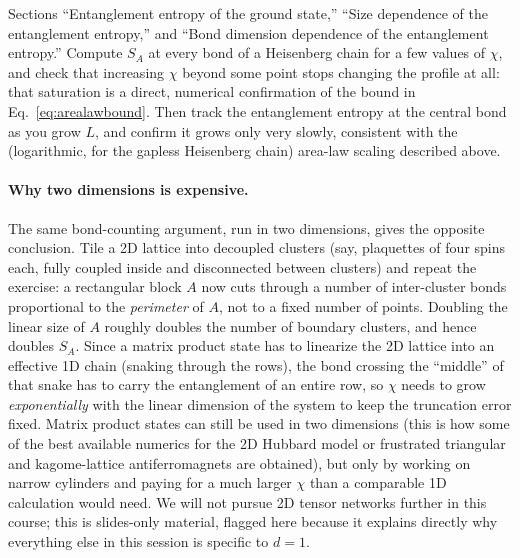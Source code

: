 \documentclass[all_sessions.tex]{subfiles}
\begin{document}
\begin{notebook}
Sections ``Entanglement entropy of the ground state,'' ``Size dependence of the entanglement
entropy,'' and ``Bond dimension dependence of the entanglement entropy.'' Compute $S_A$ at every
bond of a Heisenberg chain for a few values of $\chi$, and check that increasing $\chi$ beyond
some point stops changing the profile at all: that saturation is a direct, numerical confirmation
of the bound in Eq.~\eqref{eq:arealawbound}. Then track the entanglement entropy at the central
bond as you grow $L$, and confirm it grows only very slowly, consistent with the (logarithmic, for
the gapless Heisenberg chain) area-law scaling described above.
\end{notebook}

\paragraph{Why two dimensions is expensive.} The same bond-counting argument, run in two
dimensions, gives the opposite conclusion. Tile a 2D lattice into decoupled clusters (say,
plaquettes of four spins each, fully coupled inside and disconnected between clusters) and repeat
the exercise: a rectangular block $A$ now cuts through a number of inter-cluster bonds
proportional to the \emph{perimeter} of $A$, not to a fixed number of points. Doubling the linear
size of $A$ roughly doubles the number of boundary clusters, and hence doubles $S_A$. Since a
matrix product state has to linearize the 2D lattice into an effective 1D chain (snaking through
the rows), the bond crossing the ``middle'' of that snake has to carry the entanglement of an
entire row, so $\chi$ needs to grow \emph{exponentially} with the linear dimension of the system to
keep the truncation error fixed. Matrix product states can still be used in two dimensions (this is
how some of the best available numerics for the 2D Hubbard model or frustrated triangular and
kagome-lattice antiferromagnets are obtained), but only by working on narrow cylinders and paying
for a much larger $\chi$ than a comparable 1D calculation would need. We will not pursue 2D tensor
networks further in this course; this is slides-only material, flagged here because it explains
directly why everything else in this session is specific to $d=1$.
\end{document}
